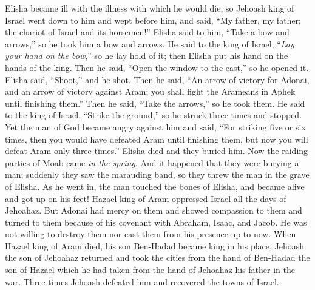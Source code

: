 \begin{biblechapter}
 Elisha became ill with the illness with which he would die, so Jehoash king of Israel went down to him and wept before him, and said, “My father, my father; the chariot of Israel and its horsemen!”
\verse Elisha said to him, “Take a bow and arrows,” so he took him a bow and arrows.
\verse He said to the king of Israel, “\textit{Lay your hand on the bow},” so he lay hold of it; then Elisha put his hand on the hands of the king.
\verse Then he said, “Open the window to the east,” so he opened it. Elisha said, “Shoot,” and he shot. Then he said, “An arrow of victory for Adonai, and an arrow of victory against Aram; you shall fight the Arameans in Aphek until finishing them.”
\verse Then he said, “Take the arrows,” so he took them. He said to the king of Israel, “Strike the ground,” so he struck three times and stopped.
\verse Yet the man of God became angry against him and said, “For striking five or six times, then you would have defeated Aram until finishing them, but now you will defeat Aram only three times.”
\verse Elisha died and they buried him. Now the raiding parties of Moab came \textit{in the spring}.
\verse And it happened that they were burying a man; suddenly they saw the marauding band, so they threw the man in the grave of Elisha. As he went in, the man touched the bones of Elisha, and became alive and got up on his feet!
\verse Hazael king of Aram oppressed Israel all the days of Jehoahaz.
\verse But Adonai had mercy on them and showed compassion to them and turned to them because of his covenant with Abraham, Isaac, and Jacob. He was not willing to destroy them nor cast them from his presence up to now.
\verse When Hazael king of Aram died, his son Ben-Hadad became king in his place.
\verse Jehoash the son of Jehoahaz returned and took the cities from the hand of Ben-Hadad the son of Hazael which he had taken from the hand of Jehoahaz his father in the war. Three times Jehoash defeated him and recovered the towns of Israel.
\end{biblechapter}

